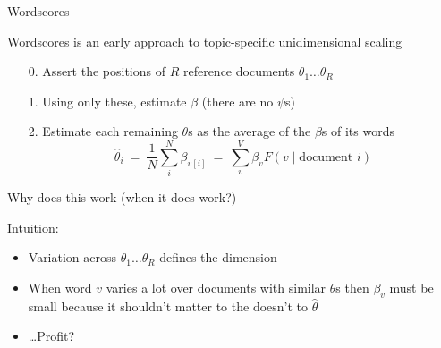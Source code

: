\documentclass{hertieteaching}
\begin{document}
\begin{frame}{Wordscores}

Wordscores is an early approach to topic-specific unidimensional scaling \parencite{Laver.etal2003}
\begin{itemize}
  \item[0.] Assert the positions of $R$ reference documents $\theta_1 \ldots \theta_R$
  \item[1.] Using only these, estimate $\beta$ (there are no $\psi$s)
  \item[2.] Estimate each remaining $\theta$s as the average of the $\beta$s of its words
  $$
  \hat{\theta}_i ~=~ \frac{1}{N} \sum^{N}_i \beta_\mathit{v[i]} ~=~ \sum^{V}_{v} \beta_v F(v \mid \text{document } i) 
  $$
\end{itemize}

\pause
Why does this work (when it does work?)

Intuition:
\begin{itemize}
  \item Variation across $\theta_1 \ldots \theta_R$ defines the dimension
  \item When word $v$ varies a lot over documents with similar $\theta$s then $\beta_v$ must be small because it shouldn't matter to the doesn't to $\hat{\theta}$ 
  \item \ldots Profit?
\end{itemize}

\end{frame}
\end{document}
